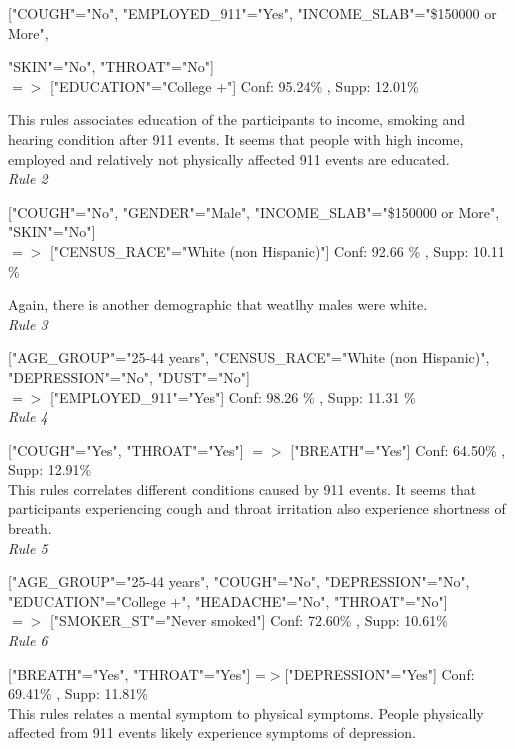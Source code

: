 \documentclass[11pt]{article}
\begin{document}
["COUGH"="No", "EMPLOYED\_911"="Yes", "INCOME\_SLAB"="\$150000 or More", 

"SKIN"="No", "THROAT"="No"] \\ 
$=>$ ["EDUCATION"="College +"] Conf: 95.24\% , Supp: 12.01\%  

This rules associates education of the participants to income, smoking and hearing condition after 911 events. It seems that people with high income, employed and
relatively not physically affected 911 events are educated. \\

\textit{Rule 2}

["COUGH"="No", "GENDER"="Male", "INCOME\_SLAB"="\$150000 or More", "SKIN"="No"] \\
$=>$ ["CENSUS\_RACE"="White (non Hispanic)"] Conf: 92.66 \% , Supp: 10.11 \% 

Again, there is another demographic that weatlhy males were white. \\

\textit{Rule 3}

["AGE\_GROUP"="25-44 years", "CENSUS\_RACE"="White (non Hispanic)", "DEPRESSION"="No", "DUST"="No"]\\
 $=>$ ["EMPLOYED\_911"="Yes"] Conf: 98.26 \% , Supp: 11.31 \%  \\

\textit{Rule 4}

["COUGH"="Yes", "THROAT"="Yes"] $=>$ ["BREATH"="Yes"] Conf: 64.50\% , Supp: 12.91\%  \\

This rules correlates different conditions caused by 911 events. It seems that participants experiencing cough and throat irritation also experience shortness of breath.\\

\textit{Rule 5}

["AGE\_GROUP"="25-44 years", "COUGH"="No", "DEPRESSION"="No", "EDUCATION"="College +", "HEADACHE"="No", "THROAT"="No"]\\
$=>$ ["SMOKER\_ST"="Never smoked"] Conf: 72.60\% , Supp: 10.61\%  \\

\textit{Rule 6}

["BREATH"="Yes", "THROAT"="Yes"] =$>$["DEPRESSION"="Yes"] Conf: 69.41\% , Supp: 11.81\%  \\

This rules relates a mental symptom to physical symptoms. People physically affected from 911 events likely experience symptoms
of depression. \\
\end{document}
